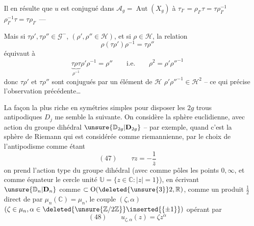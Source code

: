 Il en résulte  que $u$ est conjugué dans
$\mathcal A_g=\operatorname{Aut}(X_g)$
à $\tau_{I'}=\rho_{I'}\tau=\tau\rho_{I'}^{-1}$ 
$\rho_{I'}^{-1}\tau=\tau\rho_{I'}$ ---


Mais si $\tau\rho',\tau\rho''\in\mathcal G^-$, $(\rho',\rho''\in\mathcal H)$, et si
$\rho\in\mathcal H$, la relation
\[
\rho(\tau\rho')\rho^{-1}=\tau\rho''
\]
équivaut à
\[
\underbrace{\tau\rho\tau}_{\rho^{-1}}\rho'\rho^{-1}=\rho''
\qquad\text{i.e.}\qquad \rho^2=\rho'\rho''^{-1}
\]
donc $\tau\rho'$ et $\tau\rho''$ sont conjugués par un élément de $\mathcal H$
 $\rho'\rho''^{-1}\in\mathcal H^2$ -- ce qui précise l'observation précédente\ldots

La façon la plus riche en symétries simples pour disposer les $2g$ trous antipodiques
$D_j$ me semble la suivante. On  considère
la sphère euclidienne, avec action du groupe dihédral
$\unsure{\mathbb D_{2g}|\mathbf D_{2g}}$ -- par exemple, quand c'est la sphère de Riemann qui est
considérée comme riemannienne, par le choix de l'antipodisme comme étant
\[
(47)\qquad \tau z=-\frac{1}{\overline z}
\]
on prend l'action type du groupe dihédral (avec comme pôles les points $0,\infty$, et
comme équateur le cercle unité $\mathbb U=\{z\in\mathbb C\mathbin{:}|z|=1\}$),
 en écrivant
$\unsure{\mathbb D_n|\mathbf D_n}$ comme $\subset\operatorname O(\deleted{\unsure{3}}2,\mathbb R)$,
comme un produit $\frac12$ direct de
 par $\mu_n(\mathbb C)=\mu_n$,
le couple $(\zeta,\alpha)$ $(\zeta\in\mu_n,\alpha\in\deleted{\unsure{\mathbb Z/2\mathbb Z}}\inserted{\{\pm1\}})$ opérant par
\[
(48)\qquad u_{\zeta,\alpha}(z)=\zeta z^\alpha
\]

